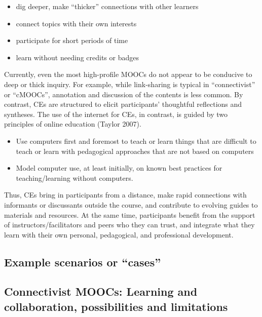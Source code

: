 \begin{itemize}
\tightlist
\item
  dig deeper, make ``thicker'' connections with other learners
\item
  connect topics with their own interests
\item
  participate for short periods of time
\item
  learn without needing credits or badges
\end{itemize}

Currently, even the most high-profile MOOCs do not appear to be
conducive to deep or thick inquiry. For example, while link-sharing is
typical in ``connectivist'' or ``cMOOCs'', annotation and discussion of
the contents is less common. By contrast, CEs are structured to elicit
participants' thoughtful reflections and syntheses. The use of the
internet for CEs, in contrast, is guided by two principles of online
education (Taylor 2007).

\begin{itemize}
\tightlist
\item
  Use computers first and foremost to teach or learn things that are
  difficult to teach or learn with pedagogical approaches that are not
  based on computers
\item
  Model computer use, at least initially, on known best practices for
  teaching/learning without computers.
\end{itemize}

Thus, CEs bring in participants from a distance, make rapid connections
with informants or discussants outside the course, and contribute to
evolving guides to materials and resources. At the same time,
participants benefit from the support of instructors/facilitators and
peers who they can trust, and integrate what they learn with their own
personal, pedagogical, and professional development.

\hypertarget{example-scenarios-or-cases}{%
\subsection{Example scenarios or
``cases''}\label{example-scenarios-or-cases}}

\hypertarget{connectivist-moocs-learning-and-collaboration-possibilities-and-limitations}{%
\subsection{Connectivist MOOCs: Learning and collaboration,
possibilities and
limitations}\label{connectivist-moocs-learning-and-collaboration-possibilities-and-limitations}}

